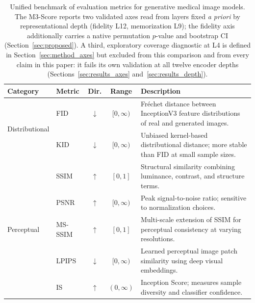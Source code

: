\documentclass[lettersize,journal]{IEEEtran}
\begin{document}

\begin{table}[t]
\centering
\caption{Unified benchmark of evaluation metrics for generative medical
         image models. The M3-Score reports two validated axes read from
         layers fixed \emph{a priori} by representational depth (fidelity
         L12, memorization L9); the fidelity axis additionally carries a
         native permutation $p$-value and bootstrap CI
         (Section~\ref{sec:proposed}). A third, exploratory coverage
         diagnostic at L4 is defined in Section~\ref{sec:method_axes} but
         excluded from this comparison and from every claim in this paper:
         it fails its own validation at all twelve encoder depths
         (Sections~\ref{sec:results_axes} and~\ref{sec:results_depth}).}
\label{tab:master}
\renewcommand{\arraystretch}{1.12}
\setlength{\tabcolsep}{5pt}
\small
\begin{tabularx}{\textwidth}{l l c c X}
\toprule
\textbf{Category} &
\textbf{Metric} &
\textbf{Dir.} &
\textbf{Range} &
\textbf{Description} \\
\midrule

\multirow{2}{*}{Distributional}
  & FID~\cite{heusel2017gans}
  & $\downarrow$ & $[0,\infty)$
  & Fr\'{e}chet distance between InceptionV3 feature distributions
    of real and generated images. \\
  & KID~\cite{binkowski2018demystifying}
  & $\downarrow$ & $[0,\infty)$
  & Unbiased kernel-based distributional distance; more stable than
    FID at small sample sizes. \\

\midrule

\multirow{5}{*}{Perceptual}
  & SSIM~\cite{wang2004image}
  & $\uparrow$ & $[0,1]$
  & Structural similarity combining luminance, contrast, and
    structure terms. \\
  & PSNR
  & $\uparrow$ & $[0,\infty)$
  & Peak signal-to-noise ratio; sensitive to normalization
    choices. \\
  & MS-SSIM
  & $\uparrow$ & $[0,1]$
  & Multi-scale extension of SSIM for perceptual consistency
    at varying resolutions. \\
  & LPIPS~\cite{zhang2018lpips}
  & $\downarrow$ & $[0,\infty)$
  & Learned perceptual image patch similarity using deep visual
    embeddings. \\
  & IS~\cite{salimans2016is}
  & $\uparrow$ & $(0,\infty)$
  & Inception Score; measures sample diversity and classifier
    confidence. \\


\end{tabularx}
\end{table}
\end{document}
